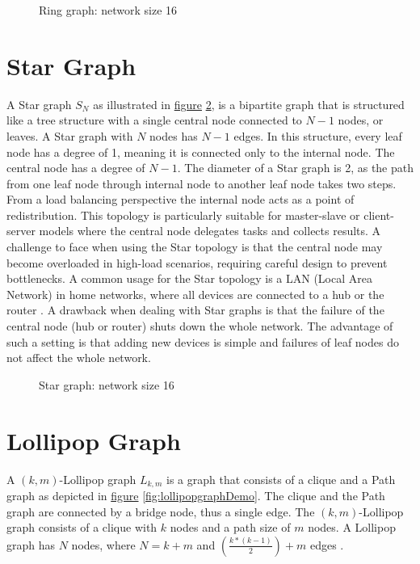 \begin{figure}[H]
    \centering
    \scalebox{0.8}{}
    \caption{Ring graph: network size 16}
    \label{fig:ring}
\end{figure}

\section{Star Graph}\label{sec:2stargraph}
A Star graph $S_N$ as illustrated in \hyperref[fig:stargraphDemo]{figure} \ref{fig:stargraphDemo}, is a bipartite graph \cite{west2001introduction} that is structured like a tree structure with a single central node connected to $N-1$ nodes, or leaves. A Star graph with $N$ nodes has $N-1$ edges. In this structure, every leaf node has a degree of 1, meaning it is connected only to the internal node. The central node has a degree of $N-1$. The diameter of a Star graph is 2, as the path from one leaf node through internal node to another leaf node takes two steps. From a load balancing perspective the internal node acts as a point of redistribution. This topology is particularly suitable for master-slave or client-server models where the central node delegates tasks and collects results. A challenge to face when using the Star topology is that the central node may become overloaded in high-load scenarios, requiring careful design to prevent bottlenecks. A common usage for the Star topology is a LAN (Local Area Network) in home networks, where all devices are connected to a hub or the router \cite{Jayeola2023}. A drawback when dealing with Star graphs is that the failure of the central node (hub or router) shuts down the whole network. The advantage of such a setting is that adding new devices is simple and failures of leaf nodes do not affect the whole network.

\begin{figure}[H]
    \centering
    
    \caption{Star graph: network size 16}
    \label{fig:stargraphDemo}
\end{figure}


\section{Lollipop Graph}\label{sec:2lollipopgraph}
A $(k, m)$-Lollipop graph $L_{k,m}$ is a graph that consists of a clique and a Path graph as depicted in \hyperref[fig:lollipopgraphDemo]{figure} \ref{fig:lollipopgraphDemo}. The clique and the Path graph are connected by a bridge node, thus a single edge. The $(k, m)$-Lollipop graph consists of a clique with $k$ nodes and a path size of $m$ nodes. A Lollipop graph has $N$ nodes, where $N = k+m$ and $(\frac{k*(k-1)}{2})+m$ edges \cite{JonassonLollipopGraphs2000}.

